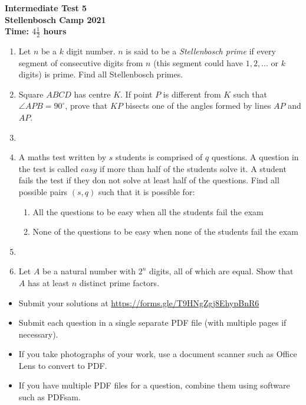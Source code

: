 \documentclass{article}
\begin{document}
\thispagestyle{empty}

\begin{center}
  \textbf{\Large Intermediate Test 5}
  \\ \vspace{1em}
  \textbf{\large Stellenbosch Camp 2021}
  \\ \vspace{1em}
  \textbf{\large Time: $4\frac{1}{2}$ hours}
\end{center}

\bigskip

\begin{enumerate}[itemsep=\fill]

\item %
Let $n$ be a $k$ digit number. $n$ is said to be a \textit{Stellenbosch prime} if every segment of consecutive digits from $n$ (this segment could have $1,2,...$ or $k$ digits) is prime. Find all Stellenbosch primes.


\item %
Square $ABCD$ has centre $K$. If point $P$ is different from $K$ such that $\angle APB = 90^{\circ}$, prove that $KP$ bisects one of the angles formed by lines $AP$ and $AP$.

\item %


\item %
A maths test written by $s$ students is comprised of $q$ questions. A question in the test is called $easy$ if more than half of the students solve it. A student fails the test if they don not solve at least half of the questions. Find all possible pairs $(s, q)$ such that it is possible for:
\begin{enumerate}
\item All the questions to be easy when all the students fail the exam
\item None of the questions to be easy when none of the students fail the exam 
\end{enumerate}

\item %


\item %
Let $A$ be a natural number with $2^n$ digits, all of which are equal. Show that $A$ has at least $n$ distinct prime factors.

\end{enumerate}


\vfill
\begin{itemize}
	\item Submit your solutions at \href{https://forms.gle/T9HNgZgj8EhypBnR6}{https://forms.gle/T9HNgZgj8EhypBnR6}
	\item Submit each question in a single separate PDF file (with multiple pages if necessary).
	\item If you take photographs of your work, use a document scanner such as Office Lens to convert to PDF.
	\item If you have multiple PDF files for a question, combine them using software such as PDFsam.
\end{itemize}
\end{document}
